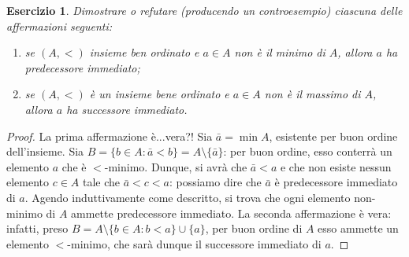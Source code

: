 \documentclass[fontsize = 11 pt, paper=A4, oneside, index=totoc, hyperref]{article}
\theoremstyle{definition}
\theoremstyle{plain}
\newtheorem{exe}{Esercizio}[section]
\begin{document}
\begin{exe}
  Dimostrare o refutare (producendo un controesempio) ciascuna delle affermazioni seguenti:
  \begin{enumerate}
    \item se \((A,<)\) insieme ben ordinato e \(a \in A\) non è il minimo di \(A\), allora \(a\) ha predecessore immediato;
    \item se \((A,<)\) è un insieme bene ordinato e \(a \in A\) non è il massimo di \(A\), allora \(a\) ha successore immediato.
  \end{enumerate}
\end{exe}
\begin{proof}
  La prima affermazione è...vera?! Sia \(\bar{a} = \min A\), esistente per buon ordine dell'insieme. Sia \(B = \lbrace b \in A \colon \bar{a} < b \rbrace = A \setminus \lbrace \bar{a} \rbrace\): per buon ordine, esso conterrà un elemento \(a\) che è \(<\)-minimo. Dunque, si avrà che \(\bar{a} < a\) e che non esiste nessun elemento \(c \in A\) tale che \(\bar{a} < c < a\): possiamo dire che \(\bar{a}\) è predecessore immediato di \(a\). Agendo induttivamente come descritto, si trova che ogni elemento non-minimo di \(A\) ammette predecessore immediato.
  La seconda affermazione è vera: infatti, preso \(B = A \setminus \lbrace b \in A \colon b < a\rbrace \cup \lbrace a \rbrace\), per buon ordine di \(A\) esso ammette un elemento \(<\)-minimo, che sarà dunque il successore immediato di \(a\).
\end{proof}
\end{document}
